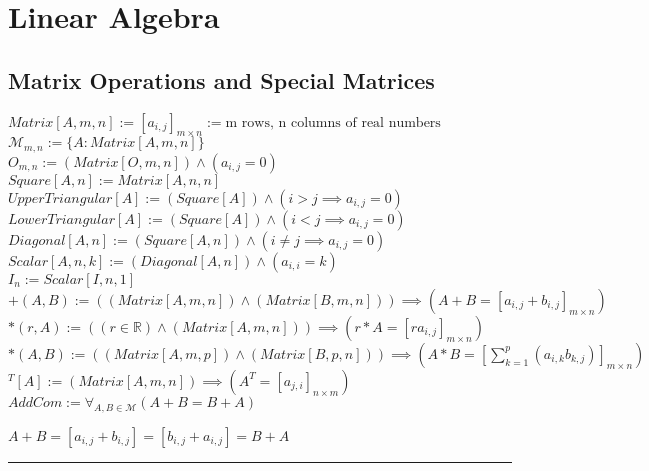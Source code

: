 \documentclass{book}
\newcommand{\abr}{:=}
\newcommand{\pr}[1]{\left(#1\right)}
\begin{document}
\chapter{Linear Algebra} %

\section{Matrix Operations and Special Matrices}
$Matrix[A, m, n] \abr [a_{i, j}]_{m \times n} \abr \text{m rows, n columns of real numbers}$ \\
$\mathcal{M}_{m, n} \abr \{A : Matrix[A, m, n]\}$ \\
$O_{m, n} \abr (Matrix[O, m, n]) \land (a_{i, j} = 0)$ \\
$Square[A, n] \abr Matrix[A, n, n]$ \\
$UpperTriangular[A] \abr (Square[A]) \land (i > j \implies a_{i, j} = 0)$ \\
$LowerTriangular[A] \abr (Square[A]) \land (i < j \implies a_{i, j} = 0)$ \\
$Diagonal[A, n] \abr (Square[A, n]) \land (i \neq j \implies a_{i, j} = 0)$ \\
$Scalar[A, n, k] \abr (Diagonal[A, n]) \land (a_{i, i} = k)$ \\
$I_n \abr Scalar[I, n, 1]$ \\

$+(A, B) \abr \pr{(Matrix[A, m, n]) \land (Matrix[B, m, n])} \implies (A + B = [a_{i, j} + b_{i, j}]_{m \times n}) $ \\
$*(r, A) \abr \pr{(r \in \mathbb{R}) \land (Matrix[A, m, n])} \implies (r * A = [r a_{i, j}]_{m \times n})$ \\
$*(A, B) \abr \pr{(Matrix[A, m, p]) \land (Matrix[B, p, n])} \implies \pr{A * B = \left[\sum_{k = 1}^{p}(a_{i, k} b_{k, j})\right]_{m \times n}}$ \\
$\phantom{ }^T[A] \abr (Matrix[A, m, n]) \implies (A^T = [a_{j, i}]_{n \times m})$ \\

$AddCom \abr \forall_{A, B \in \mathcal{M}}(A + B = B + A)$
\begin{enumerate}
  \lit $A + B = [a_{i, j} + b_{i, j}] = [b_{i, j} + a_{i, j}] = B + A$
\end{enumerate} \vspace{.75mm} \hrule \vspace{.75mm} \ \\
\end{document}
